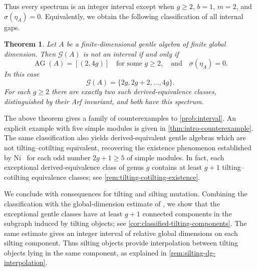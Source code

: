 \documentclass[11pt]{amsart}
\theoremstyle{definition}
\theoremstyle{plain}
\newtheorem{theorem}{Theorem}[section]
\theoremstyle{definition}
\theoremstyle{definition}
\newcommand{\AG}{\operatorname{AG}}
\newcommand{\GSpec}{\mathcal G}
\begin{document}
Thus every spectrum is an integer interval except when
$g\geq2$, $b=1$, $m=2$, and $\sigma(\eta_A)=0$.
Equivalently, we obtain the following classification of all internal gaps.


\begin{theorem}
\label{thm:noninterval-classification}
Let $A$ be a finite-dimensional gentle algebra of finite global
dimension.  Then $\GSpec(A)$ is not an interval if and only if
\[
 \AG(A)=[(2,4g)]\quad\text{for some }g\geq2, 
 \quad \text{and}  \quad  \sigma(\eta_A)=0.
\]
In this case
\[
 \GSpec(A)=\{2g,2g+2,\ldots,4g\}.
\]
For each $g\geq2$ there are exactly two such derived-equivalence classes,
distinguished by their Arf invariant, and both have this spectrum.
\end{theorem}
The above theorem gives a family of counterexamples to
\cref{prob:interval}.  An explicit example with five simple modules
is given in \cref{thm:intro-counterexample}. The same classification also yields derived-equivalent gentle algebras
which are not tilting--cotilting equivalent, recovering the existence
phenomenon established by Ni~\cite[Theorem~1.2]{Ni2026} for each odd
number $2g+1\geq5$ of simple modules.
In fact, each exceptional derived-equivalence class of genus $g$
contains at least $g+1$ tilting--cotilting equivalence classes;
see \cref{rem:tilting-cotilting-existence}.

We conclude with consequences for tilting and silting
mutation. Combining the classification with the
global-dimension estimate of \cite[Lemma~4.6(4)]{ChenLinZhou}, we show that the
exceptional gentle classes have at least $g+1$ connected
components in the subgraph induced by tilting objects;
see \cref{cor:classified-tilting-components}.
The same estimate gives an integer interval of relative
global dimensions on each silting component. Thus
silting objects provide interpolation between tilting
objects lying in the same component, as explained in
\cref{rem:silting-dg-interpolation}.

\end{document}
